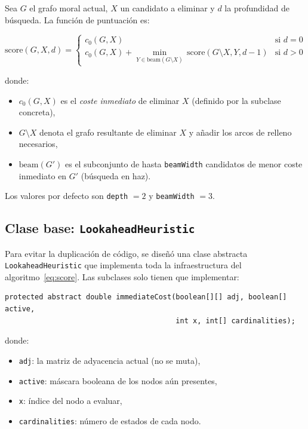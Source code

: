 \documentclass[11pt, a4paper]{article}
\begin{document}
Sea $G$ el grafo moral actual, $X$ un candidato a eliminar y $d$ la profundidad de búsqueda. La función de puntuación es:

\begin{equation}
  \mathrm{score}(G, X, d) =
  \begin{cases}
    c_0(G, X)                                                                    & \text{si } d = 0 \\
    c_0(G, X) + \displaystyle\min_{Y \in \mathrm{beam}(G \setminus X)}\,\mathrm{score}(G \setminus X, Y, d-1) & \text{si } d > 0
  \end{cases}
  \label{eq:score}
\end{equation}

donde:
\begin{itemize}
  \item $c_0(G, X)$ es el \emph{coste inmediato} de eliminar $X$ (definido por la subclase concreta),
  \item $G \setminus X$ denota el grafo resultante de eliminar $X$ y añadir los arcos de relleno necesarios,
  \item $\mathrm{beam}(G')$ es el subconjunto de hasta \texttt{beamWidth} candidatos de menor coste inmediato en $G'$ (búsqueda en haz).
\end{itemize}

Los valores por defecto son \texttt{depth} $= 2$ y \texttt{beamWidth} $= 3$.

\subsection{Clase base: \texttt{LookaheadHeuristic}}

Para evitar la duplicación de código, se diseñó una clase abstracta \texttt{LookaheadHeuristic} que implementa toda la infraestructura del algoritmo~\eqref{eq:score}. Las subclases solo tienen que implementar:

\begin{lstlisting}[caption={Método plantilla de LookaheadHeuristic}]
protected abstract double immediateCost(boolean[][] adj, boolean[] active,
                                        int x, int[] cardinalities);
\end{lstlisting}

donde:
\begin{itemize}
  \item \texttt{adj}: la matriz de adyacencia actual (no se muta),
  \item \texttt{active}: máscara booleana de los nodos aún presentes,
  \item \texttt{x}: índice del nodo a evaluar,
  \item \texttt{cardinalities}: número de estados de cada nodo.
\end{itemize}
\end{document}
